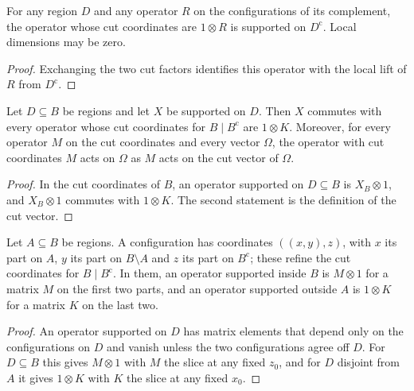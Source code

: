 \begin{lemma}
    \label{lem:right_local_lift_support}
    \leanok
    For any region $D$ and any operator $R$ on the configurations of its
    complement, the operator whose cut coordinates are $1\otimes R$ is
    supported on $D^{\mathrm c}$. Local dimensions may be zero.
\end{lemma}
\begin{proof}\leanok
    Exchanging the two cut factors identifies this operator with the local
    lift of $R$ from $D^{\mathrm c}$.
\end{proof}

\begin{theorem}
    \label{thm:cut_coordinate_operators}
    \leanok
    Let $D\subseteq B$ be regions and let $X$ be supported on $D$. Then $X$
    commutes with every operator whose cut coordinates for $B\mid B^{\mathrm c}$
    are $1\otimes K$. Moreover, for every operator $M$ on the cut coordinates
    and every vector $\Omega$, the operator with cut coordinates $M$ acts on
    $\Omega$ as $M$ acts on the cut vector of $\Omega$.
\end{theorem}
\begin{proof}\leanok
    In the cut coordinates of $B$, an operator supported on $D\subseteq B$ is
    $X_B\otimes1$, and $X_B\otimes1$ commutes with $1\otimes K$. The second
    statement is the definition of the cut vector.
\end{proof}

\begin{theorem}
    \label{thm:three_way_cut_coordinates}
    \leanok
    Let $A\subseteq B$ be regions. A configuration has coordinates
    $((x,y),z)$, with $x$ its part on $A$, $y$ its part on $B\setminus A$ and
    $z$ its part on $B^{\mathrm c}$; these refine the cut coordinates for
    $B\mid B^{\mathrm c}$. In them, an operator supported inside $B$ is
    $M\otimes1$ for a matrix $M$ on the first two parts, and an operator
    supported outside $A$ is $1\otimes K$ for a matrix $K$ on the last two.
\end{theorem}
\begin{proof}\leanok
    An operator supported on $D$ has matrix elements that depend only on the
    configurations on $D$ and vanish unless the two configurations agree off
    $D$. For $D\subseteq B$ this gives $M\otimes1$ with $M$ the slice at any
    fixed $z_0$, and for $D$ disjoint from $A$ it gives $1\otimes K$ with $K$
    the slice at any fixed $x_0$.
\end{proof}

